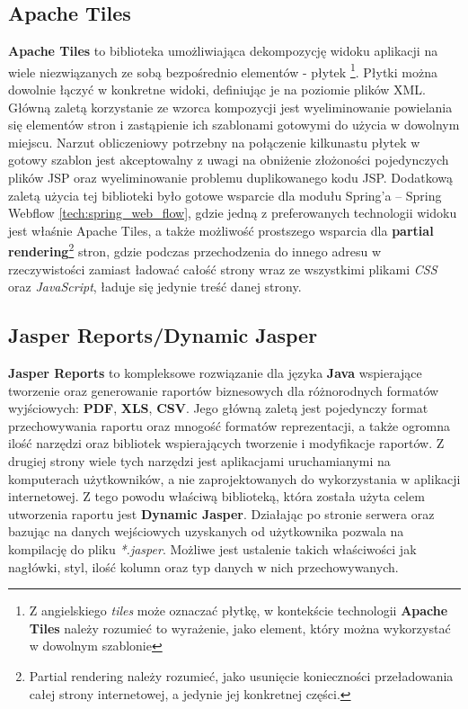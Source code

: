 \subsection{Apache Tiles}
\label{tech:tiles}
	\textbf{Apache Tiles} to biblioteka umożliwiająca dekompozycję widoku aplikacji na wiele niezwiązanych ze sobą bezpośrednio elementów - płytek \footnote{Z angielskiego \textit{tiles} może oznaczać płytkę, w kontekście technologii \textbf{Apache Tiles} należy rozumieć to wyrażenie, jako element, który można wykorzystać w dowolnym szablonie}. Płytki można dowolnie łączyć w konkretne widoki, definiując je na poziomie plików XML. Główną zaletą korzystanie ze wzorca kompozycji jest wyeliminowanie powielania się elementów stron i zastąpienie ich szablonami gotowymi do użycia w dowolnym miejscu. Narzut obliczeniowy potrzebny na połączenie kilkunastu płytek w gotowy szablon jest akceptowalny z uwagi na obniżenie złożoności pojedynczych plików JSP oraz wyeliminowanie problemu duplikowanego kodu JSP. 
	Dodatkową zaletą użycia tej biblioteki było gotowe wsparcie dla modułu Spring’a – Spring Webflow \ref{tech:spring_web_flow}, gdzie jedną z preferowanych technologii widoku jest właśnie Apache Tiles, a także możliwość prostszego wsparcia dla \textbf{partial rendering}\footnote{Partial rendering należy rozumieć, jako usunięcie konieczności przeładowania całej strony internetowej, a jedynie jej konkretnej części.} stron, gdzie podczas przechodzenia do innego adresu w rzeczywistości zamiast ładować całość strony wraz ze wszystkimi plikami \textit{CSS} oraz \textit{JavaScript}, ładuje się jedynie treść danej strony. 
	
\subsection{Jasper Reports/Dynamic Jasper}
\label{tech:jasperReports}
	\textbf{Jasper Reports} to kompleksowe rozwiązanie dla języka \textbf{Java} wspierające tworzenie oraz generowanie raportów biznesowych dla różnorodnych formatów wyjściowych: \textbf{PDF}, \textbf{XLS}, \textbf{CSV}. Jego główną zaletą jest pojedynczy format przechowywania raportu oraz mnogość formatów reprezentacji, a także ogromna ilość  narzędzi oraz bibliotek wspierających tworzenie i modyfikacje raportów. Z drugiej strony wiele tych narzędzi jest aplikacjami uruchamianymi na komputerach użytkowników, a nie zaprojektowanych do wykorzystania w aplikacji internetowej. Z tego powodu właściwą biblioteką, która została użyta celem utworzenia raportu jest \textbf{Dynamic Jasper}. Działając po stronie serwera oraz bazując na danych wejściowych uzyskanych od użytkownika pozwala na kompilację do pliku \textit{*.jasper}. Możliwe jest ustalenie takich właściwości jak nagłówki, styl, ilość kolumn oraz typ danych w nich przechowywanych.


